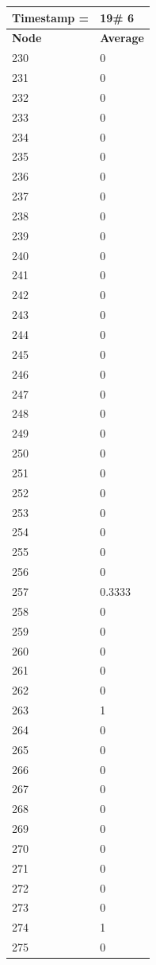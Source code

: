 \begin{tabular}{|l||l|}
\hline
\textbf{Timestamp =} & \textbf{19}\# 6\\\hline
	\textbf{Node} & \textbf{Average} \\ \hline
\hline
	230 & 0 \\ \hline
	231 & 0 \\ \hline
	232 & 0 \\ \hline
	233 & 0 \\ \hline
	234 & 0 \\ \hline
	235 & 0 \\ \hline
	236 & 0 \\ \hline
	237 & 0 \\ \hline
	238 & 0 \\ \hline
	239 & 0 \\ \hline
	240 & 0 \\ \hline
	241 & 0 \\ \hline
	242 & 0 \\ \hline
	243 & 0 \\ \hline
	244 & 0 \\ \hline
	245 & 0 \\ \hline
	246 & 0 \\ \hline
	247 & 0 \\ \hline
	248 & 0 \\ \hline
	249 & 0 \\ \hline
	250 & 0 \\ \hline
	251 & 0 \\ \hline
	252 & 0 \\ \hline
	253 & 0 \\ \hline
	254 & 0 \\ \hline
	255 & 0 \\ \hline
	256 & 0 \\ \hline
	257 & 0.3333 \\ \hline
	258 & 0 \\ \hline
	259 & 0 \\ \hline
	260 & 0 \\ \hline
	261 & 0 \\ \hline
	262 & 0 \\ \hline
	263 & 1 \\ \hline
	264 & 0 \\ \hline
	265 & 0 \\ \hline
	266 & 0 \\ \hline
	267 & 0 \\ \hline
	268 & 0 \\ \hline
	269 & 0 \\ \hline
	270 & 0 \\ \hline
	271 & 0 \\ \hline
	272 & 0 \\ \hline
	273 & 0 \\ \hline
	274 & 1 \\ \hline
	275 & 0 \\ \hline
\end{tabular}

